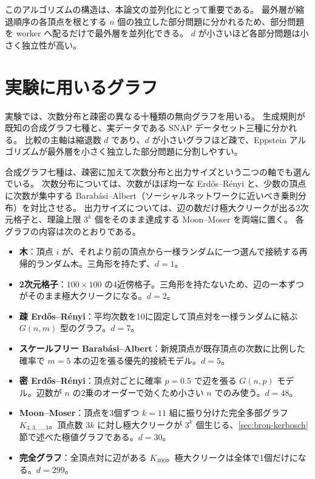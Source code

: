 このアルゴリズムの構造は、本論文の並列化にとって重要である。
最外層が縮退順序の各頂点を根とする $n$ 個の独立した部分問題に分かれるため、部分問題を worker へ配るだけで最外層を並列化できる。
$d$ が小さいほど各部分問題は小さく独立性が高い。

\section{実験に用いるグラフ}
\label{sec:graphs}

実験では、次数分布と疎密の異なる十種類の無向グラフを用いる。
生成規則が既知の合成グラフ七種と、実データである SNAP データセット三種に分かれる。
比較の主軸は縮退数 $d$ であり、$d$ が小さいグラフほど疎で、Eppstein アルゴリズムが最外層を小さく独立した部分問題に分割しやすい。

合成グラフ七種は、疎密に加えて次数分布と出力サイズという二つの軸でも選んでいる。
次数分布については、次数がほぼ均一な Erd\H{o}s--R\'enyi と、少数の頂点に次数が集中する Barab\'asi--Albert（ソーシャルネットワークに近いべき乗則分布）を対比させる。
出力サイズについては、辺の数だけ極大クリークが出る2次元格子と、理論上限 $3^{k}$ 個をそのまま達成する Moon--Moser を両端に置く。
各グラフの内容は次のとおりである。

\begin{itemize}
  \item \textbf{木}：頂点 $i$ が、それより前の頂点から一様ランダムに一つ選んで接続する再帰的ランダム木。三角形を持たず、$d = 1$。
  \item \textbf{2次元格子}：$100 \times 100$ の4近傍格子。三角形を持たないため、辺の一本ずつがそのまま極大クリークになる。$d = 2$。
  \item \textbf{疎 Erd\H{o}s--R\'enyi}：平均次数を10に固定して頂点対を一様ランダムに結ぶ $G(n, m)$ 型のグラフ。$d = 7$。
  \item \textbf{スケールフリー Barab\'asi--Albert}：新規頂点が既存頂点の次数に比例した確率で $m = 5$ 本の辺を張る優先的接続モデル。$d = 5$。
  \item \textbf{密 Erd\H{o}s--R\'enyi}：頂点対ごとに確率 $p = 0.5$ で辺を張る $G(n, p)$ モデル。辺数が $n$ の2乗のオーダーで効くため小さい $n$ でのみ使う。$d = 48$。
  \item \textbf{Moon--Moser}：頂点を3個ずつ $k = 11$ 組に振り分けた完全多部グラフ $K_{3,3,\dots,3}$。頂点数 $3k$ に対し極大クリークが $3^{k}$ 個生じる、\ref{sec:bron-kerbosch}節で述べた極値グラフである。$d = 30$。
  \item \textbf{完全グラフ}：全頂点対に辺がある $K_{300}$。極大クリークは全体で1個だけになる。$d = 299$。
\end{itemize}

